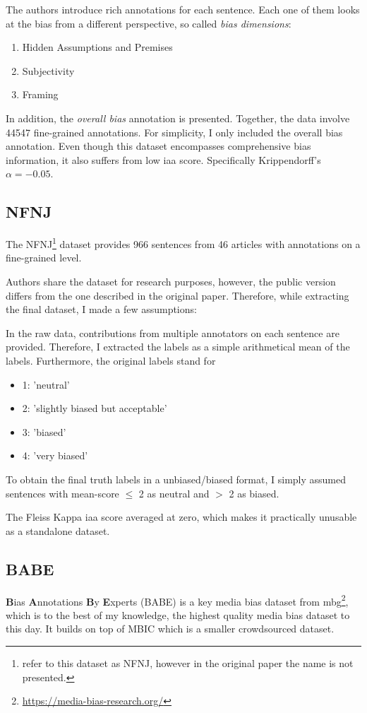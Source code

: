 The authors introduce rich annotations for each sentence. Each one of them looks at the bias from a different perspective, so called \textit{bias dimensions}:
\begin{enumerate}
    \item Hidden Assumptions and Premises
    \item Subjectivity
    \item Framing
\end{enumerate}
In addition, the \textit{overall bias} annotation is presented. Together, the data involve 44547 fine-grained annotations. For simplicity, I only included the overall bias annotation.
Even though this dataset encompasses comprehensive bias information, it also suffers from low \Gls{iaa} score. Specifically Krippendorff’s $\alpha = -0.05$.



\subsection{NFNJ}
The NFNJ\footnote{\cite{farber2020multidimensional} refer to this dataset as NFNJ, however in the original paper the name is not presented.} dataset provides 966 sentences from 46 articles with annotations on a fine-grained level.

Authors share the dataset for research purposes, however, the public version differs from the one described in the original paper. Therefore, while extracting the final dataset, I made a few assumptions:

In the raw data, contributions from multiple annotators on each sentence are provided. Therefore, I extracted the labels as a simple arithmetical mean of the labels. Furthermore, the original labels stand for 
\begin{itemize}
    \item 1: 'neutral'
    \item 2: 'slightly biased but acceptable'
    \item 3: 'biased'
    \item 4: 'very biased'
\end{itemize}
To obtain the final truth labels in a unbiased/biased format, I simply assumed sentences with mean-score $\leq$ 2 as neutral and $>$ 2 as biased.

The Fleiss Kappa \Gls{iaa} score averaged at zero, which makes it practically unusable as a standalone dataset.



\subsection{BABE}
\textbf{B}ias \textbf{A}nnotations \textbf{B}y \textbf{E}xperts (BABE) is a key media bias dataset from \Gls{mbg}\footnote{\url{https://media-bias-research.org/}}, which is to the best of my knowledge, the highest quality media bias dataset to this day. It builds on top of MBIC \cite{Spinde2021MBIC} which is a smaller crowdsourced dataset.

